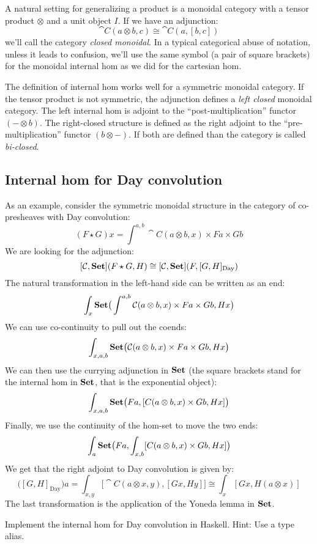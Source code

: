 \documentclass[DaoFP]{subfiles}
\begin{document}
A natural setting for generalizing a product is a monoidal category with a tensor product $\otimes$ and a unit object $I$. If we have an adjunction:
\[ \cat C (a \otimes b, c) \cong \cat C (a, [b, c]) \]
we'll call the category \emph{closed monoidal}. In a typical categorical abuse of notation, unless it leads to confusion, we'll use the same symbol (a pair of square brackets)  for the monoidal internal hom as we did for the cartesian hom.

The definition of internal hom works well for a symmetric monoidal category. If the tensor product is not symmetric, the adjunction defines a \emph{left closed} monoidal category. The left internal hom is adjoint to the ``post-multiplication'' functor $(- \otimes b)$. The right-closed structure is defined as the right adjoint to the ``pre-multiplication'' functor $(b \otimes -)$. If both are defined than the category is called \emph{bi-closed}.


\subsection{Internal hom for Day convolution}

As an example, consider the symmetric monoidal structure in the category of co-presheaves with Day convolution:
\[ (F \star G) x = \int^{a, b} \cat C (a \otimes b, x) \times F a \times G b \]
We are looking for the adjunction:
\[ [\mathcal{C}, \mathbf{Set}] (F \star G, H) \cong  [\mathcal{C}, \mathbf{Set}] (F, [G, H]_{\text{Day}}) \]
The natural transformation in the left-hand side can be written as an end:
\[ \int_x \mathbf{Set} \big( \int^{a, b} \mathcal{C} (a \otimes b, x) \times F a \times G b, H x \big) \]
We can use co-continuity to pull out the coends:
\[ \int_{x, a, b} \mathbf{Set} \big( \mathcal{C} (a \otimes b, x) \times F a \times G b, H x \big) \]
We can then use the currying adjunction in $\mathbf{Set}$ (the square brackets stand for the internal hom in $\mathbf{Set}$, that is the exponential object):
\[ \int_{x, a, b} \mathbf{Set} \big( F a, [C (a \otimes b, x)  \times G b, H x] \big) \]
Finally, we use the continuity of the hom-set to move the two ends:
\[ \int_{a} \mathbf{Set} \big( F a, \int_{x, b} [C (a \otimes b, x)  \times G b, H x] \big) \]
We get that the right adjoint to Day convolution is given by:
\[ \big([G, H]_{\text{Day}}\big) a = \int_{x, y} \big[\cat C(a \otimes x, y), [G x, H y]\big] \cong \int_x [G x, H (a \otimes x)]\]
The last transformation is the application of the Yoneda lemma in $\mathbf{Set}$.
\begin{exercise}
Implement the internal hom for Day convolution in Haskell. Hint: Use a type alias.
\end{exercise}
\end{document}
